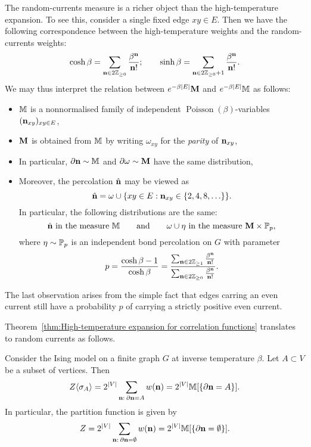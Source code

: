 The random-currents measure is a richer object than the high-temperature expansion.
To see this, consider a single fixed edge $xy\in E$.
Then we have the following correspondence between the high-temperature weights
and the random-currents weights:
\[
    \cosh\beta = \sum_{\n\in 2\Z_{\geq 0}} \frac{\beta^\n}{\n!}
    ;
    \qquad
    \sinh\beta = \sum_{\n\in 2\Z_{\geq 0}+1} \frac{\beta^\n}{\n!}.
\]
We may thus interpret the relation between $e^{-\beta|E|}\bfM$ and $e^{-\beta|E|}\M$ as follows:
\begin{itemize}
    \item $\M$ is a nonnormalised family of independent $\operatorname{Poisson}(\beta)$-variables $(\n_{xy})_{xy\in E}$,
    \item $\bfM$ is obtained from $\M$ by writing $\omega_{xy}$ for the \emph{parity} of $\n_{xy}$,
    \item In particular, $\partial\n\sim\M$ and $\partial\omega\sim\bfM$ have the same distribution,
    \item Moreover, the percolation $\hat\n$ may be viewed as
    \[
        \hat\n = \omega \cup\{xy\in E: \n_{xy}\in\{2,4,8,\ldots\}\}.
    \]
    In particular, the following distributions are the same:
    \[
        \text{$\hat\n$ in the measure $\M$}
        \qquad
        \text{and}
        \qquad
        \text{$\omega\cup\eta$ in the measure $\bfM\times\P_{p}$,}
    \]
    where $\eta\sim\P_p$ is an independent bond percolation on $G$
    with parameter
    \[
        p
        =\frac{\cosh\beta-1}{\cosh\beta}
        =\frac{
            \sum_{\n\in 2\Z_{\geq 1}} \frac{\beta^\n}{\n!}
        }{
            \sum_{\n\in 2\Z_{\geq 0}} \frac{\beta^\n}{\n!}
        }
        .
    \]
\end{itemize}

The last observation arises from the simple fact that edges carring an even current
still have a probability $p$ of carrying a strictly positive even current.

Theorem~\ref{thm:High-temperature expansion for correlation functions}
translates to random currents as follows.

\begin{theorem}
    \label{thm:current_representation_of_correlation_functions}
    Consider the Ising model on a finite graph $G$ at inverse temperature $\beta$.
    Let $A\subset V$ be a subset of vertices.
    Then
    \[
        Z\langle\sigma_A\rangle
        =2^{|V|}\sum_{\n:\:\partial\n=A}
        w(\n)
        =
        2^{|V|}\M[\{\partial\n=A\}].
    \]
    In particular, the partition function is given by
    \[
        Z=2^{|V|}\sum_{\n:\:\partial\n=\emptyset}
        w(\n)
        =
        2^{|V|}\M[\{\partial\n=\emptyset\}].
    \]
\end{theorem}

